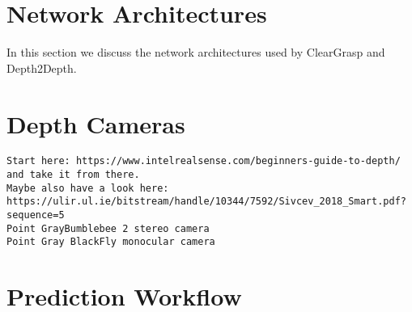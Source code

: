 

\section{Network Architectures}

In this section we discuss the network architectures used by ClearGrasp and Depth2Depth.



\section{Depth Cameras}

\begin{verbatim}
Start here: https://www.intelrealsense.com/beginners-guide-to-depth/
and take it from there.
Maybe also have a look here:
https://ulir.ul.ie/bitstream/handle/10344/7592/Sivcev_2018_Smart.pdf?sequence=5
Point GrayBumblebee 2 stereo camera
Point Gray BlackFly monocular camera
\end{verbatim}


\section{Prediction Workflow}

